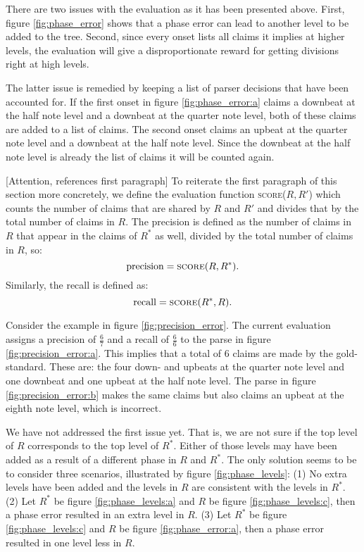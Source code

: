 There are two issues with the evaluation as it has been presented above. First, figure \ref{fig:phase_error} shows that a phase error can lead to another level to be added to the tree. Second, since every onset lists all claims it implies at higher levels, the evaluation will give a disproportionate reward for getting divisions right at high levels.

The latter issue is remedied by keeping a list of parser decisions that have been accounted for. If the first onset in figure \ref{fig:phase_error:a} claims a downbeat at the half note level and a downbeat at the quarter note level, both of these claims are added to a list of claims. The second onset claims an upbeat at the quarter note level and a downbeat at the half note level. Since the downbeat at the half note level is already the list of claims it will be counted again.

[Attention, references first paragraph]
To reiterate the first paragraph of this section more concretely, we define the evaluation function \textsc{score}($R, R'$) which counts the number of claims that are shared by $R$ and $R'$ and divides that by the total number of claims in $R$. The precision is defined as the number of claims in $R$ that appear in the claims of $R^*$ as well, divided by the total number of claims in $R$, so:
\begin{equation}
\label{eq:precision}
\mathrm{precision} = \textsc{score}(R, R^*).
\end{equation}
Similarly, the recall is defined as:
\begin{equation}
\label{eq:recall}
\mathrm{recall} = \textsc{score}(R^*, R).
\end{equation}

Consider the example in figure \ref{fig:precision_error}. The current evaluation assigns a precision of $\frac{6}{7}$ and a recall of $\frac{6}{6}$ to the parse in figure \ref{fig:precision_error:a}. This implies that a total of $6$ claims are made by the gold-standard. These are: the four down- and upbeats at the quarter note level and one downbeat and one upbeat at the half note level. The parse in figure \ref{fig:precision_error:b} makes the same claims but also claims an upbeat at the eighth note level, which is incorrect.

We have not addressed the first issue yet. That is, we are not sure if the top level of $R$ corresponds to the top level of $R^*$. Either of those levels may have been added as a result of a different phase in $R$ and $R^*$. The only solution seems to be to consider three scenarios, illustrated by figure \ref{fig:phase_levels}: (1) No extra levels have been added and the levels in $R$ are consistent with the levels in $R^*$. (2) Let $R^*$ be figure \ref{fig:phase_levels:a} and $R$ be figure \ref{fig:phase_levels:c}, then a phase error resulted in an extra level in $R$. (3) Let $R^*$ be figure \ref{fig:phase_levels:c} and $R$ be figure \ref{fig:phase_error:a}, then a phase error resulted in one level less in $R$. 


